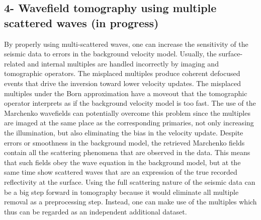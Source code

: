\subsection{4- Wavefield tomography using multiple scattered waves (in progress)} 
By properly using multi-scattered waves, one can increase the sensitivity of the seismic
data to errors in the background velocity model. Usually, the surface-related and internal
multiples are handled incorrectly by imaging and tomographic operators. The 
misplaced multiples produce coherent defocused events that drive the inversion
toward lower velocity updates. The misplaced multiples under the Born approximation 
have a moveout that the tomographic operator interprets as if the background velocity model is too fast.   
 The use of the Marchenko wavefields can potentially overcome this problem since 
the multiples are imaged at the same place as the corresponding primaries, not only  increasing
the illumination, but also eliminating the bias in the velocity update. 
 Despite errors or smoothness in the background model, the retrieved Marchenko fields
contain all the scattering phenomena that are observed in the data. This means that
such fields obey the wave equation in the background model, but at the same time 
show scattered waves that are an expression of the true recorded reflectivity
at the surface. Using the full scattering nature of the seismic data 
can be a big step forward in tomography because it would eliminate all
multiple removal as a preprocessing step. Instead, one can make use of the multiples
which thus can be regarded as an independent additional dataset. 



